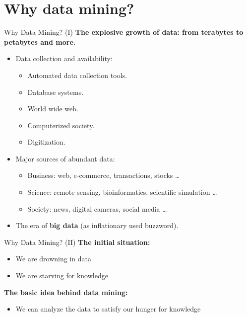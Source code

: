 \section{Why data mining?}

\begin{frame}{Why Data Mining? (I)}
	\textbf{The explosive growth of data: from terabytes to petabytes and
		more.}\\
	\begin{itemize}
		\item Data collection and availability:
		      \begin{itemize}
			      \item Automated data collection tools.
			      \item Database systems.
			      \item World wide web.
			      \item Computerized society.
			      \item Digitization.
		      \end{itemize}
		\item Major sources of abundant data:
		      \begin{itemize}
			      \item Business: web, e-commerce, transactions, stocks \ldots
			      \item Science: remote sensing, bioinformatics, scientific
			            simulation \ldots
			      \item Society: news, digital cameras, social media \ldots
		      \end{itemize}
		\item The era of \textbf{big data} (as inflationary used buzzword).
	\end{itemize}
\end{frame}

\begin{frame}{Why Data Mining? (II)}
	\textbf{The initial situation:}
	\begin{itemize}
		\item We are drowning in  data
		\item We are starving for knowledge
	\end{itemize}
	\textbf{The basic idea behind data mining:}
	\begin{itemize}
		\item We can analyze the data to satisfy our hunger for knowledge
	\end{itemize}
\end{frame}

